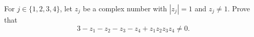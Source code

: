 For $j \in \{ 1,2,3,4\}$, let $z_j$ be a complex number with $| z_j | = 1$ and $z_j \neq 1$. Prove that
$$3 - z_1 - z_2 - z_3 - z_4 + z_1z_2z_3z_4 \neq 0.$$